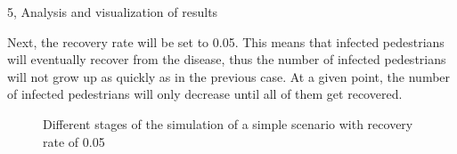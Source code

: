 \documentclass[10pt,a4paper]{article}
\begin{document}
\begin{task}{5, Analysis and visualization of results}
\bigskip

Next, the recovery rate will be set to 0.05. This means that infected pedestrians will eventually recover from the disease, thus the number of infected pedestrians will not grow up as quickly as in the previous case. At a given point, the number of infected pedestrians will only decrease until all of them get recovered.

\begin{figure} [H]
 \centering
 \caption{Different stages of the simulation of a simple scenario with recovery rate of 0.05}
 \label{simple_recover05}
\end{figure}


\end{task}
\end{document}
